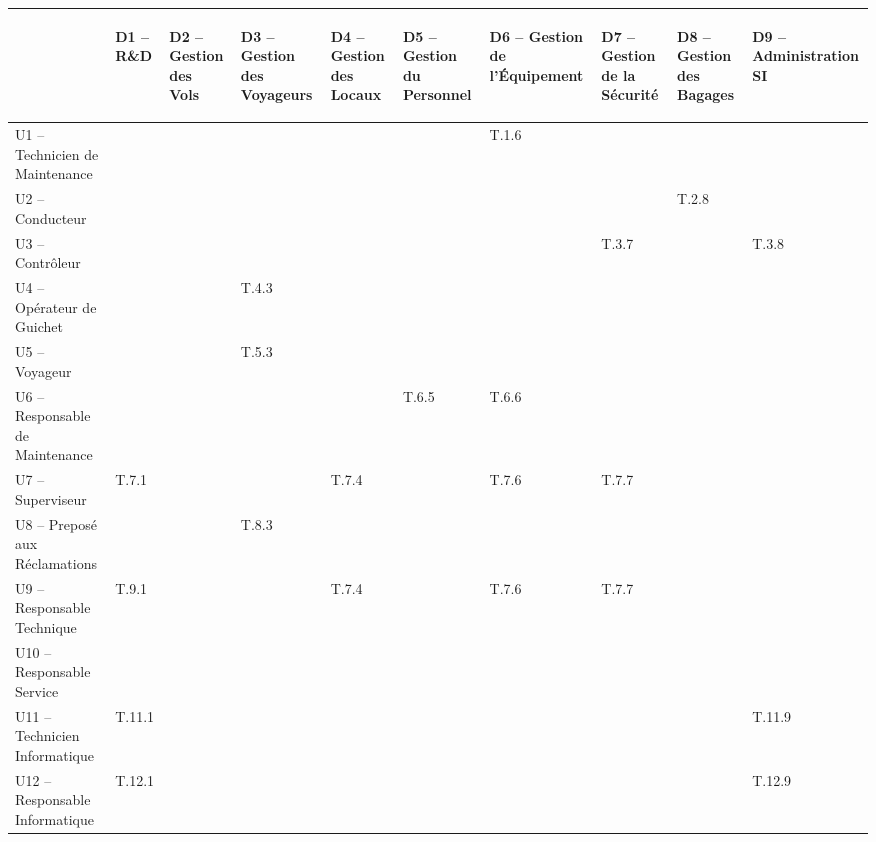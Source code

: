 \providecommand{\DJSPU}[1]{}


\begin {tabular} {| l | l | l | l | l | l | l | l | l | l | }
\hline
~
&\begin{sideways}D1 -- R\&D\end{sideways}
&\begin{sideways}D2 -- Gestion des Vols\end{sideways}
&\begin{sideways}D3 -- Gestion des Voyageurs\end{sideways}
&\begin{sideways}D4 -- Gestion des Locaux\end{sideways}
&\begin{sideways}D5 -- Gestion du Personnel\end{sideways}
&\begin{sideways}D6 -- Gestion de l'Équipement\end{sideways}
&\begin{sideways}D7 -- Gestion de la Sécurité\end{sideways}
&\begin{sideways}D8 -- Gestion des Bagages\end{sideways}
&\begin{sideways}D9 -- Administration SI\end{sideways}\\
\hline
U1 --  Technicien de Maintenance  & & & & & &T.1.6 & & &  \\
\hline
U2 --  Conducteur  & & & & & & & &T.2.8 &  \\
\hline
U3 --  Contrôleur  & & & & & & &T.3.7 & &T.3.8  \\
\hline
U4 --  Opérateur de Guichet  & & &T.4.3 & & & & & &  \\
\hline
U5 --  Voyageur  & & &T.5.3 & & & & & &  \\
\hline
U6 --  Responsable de Maintenance  & & & & &T.6.5 &T.6.6 & &  &\\
\hline
U7 --  Superviseur  &\DJSPU1 T.7.1 & & &T.7.4 & &T.7.6 &T.7.7 & &\\
\hline
U8 --  Preposé aux Réclamations  & & &T.8.3 & & & & & &\\
\hline
U9 --  Responsable Technique  &\DJSPU1 T.9.1 & & &T.7.4 & &T.7.6 &T.7.7 & &\\
\hline
U10 --  Responsable Service  & & & & & & & & &  \\
\hline
U11 --  Technicien Informatique  &T.11.1 & & & & & & & &T.11.9  \\
\hline
U12 --  Responsable Informatique  &T.12.1 & & & & & & & &T.12.9  \\
\hline
\end {tabular}

